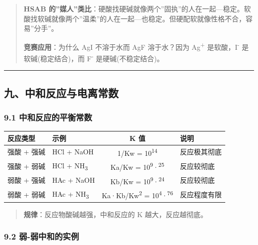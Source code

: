 \documentclass[a4paper,11pt]{ctexart}
\newcounter{none}
\newcommand{\箭}{\ensuremath{\rightarrow}}
\newcommand{\左箭}{\ensuremath{\leftarrow}}
\newcommand{\上箭}{\ensuremath{\uparrow}}
\newcommand{\下箭}{\ensuremath{\downarrow}}
\newcommand{\衡}{\ensuremath{\rightleftharpoons}}
\newcommand{\双箭}{\ensuremath{\leftrightarrow}}
\newcommand{\约等于}{\ensuremath{\approx}}
\newcommand{\小于等于}{\ensuremath{\leq}}
\newcommand{\大于等于}{\ensuremath{\geq}}
\newcommand{\不等于}{\ensuremath{\neq}}
\newcommand{\西格马}{\ensuremath{\sigma}}
\newcommand{\派}{\ensuremath{\pi}}
\begin{document}
\begin{quote}
\textbf{HSAB 的''媒人''类比}：硬酸找硬碱就像两个''固执''的人在一起---稳定。软酸找软碱就像两个''温柔''的人在一起---也稳定。但硬配软就像性格不合，容易''分手''。

\textbf{竞赛应用}：为什么 AgI 不溶于水而 AgF 溶于水？因为 Ag\textsuperscript{+} 是软酸，I\textsuperscript{-} 是软碱(稳定结合)，而 F\textsuperscript{-} 是硬碱(不稳定结合)。
\end{quote}

\begin{center}\rule{0.5\linewidth}{0.5pt}\end{center}

\subsection{九、中和反应与电离常数}\label{ux4e5dux4e2dux548cux53cdux5e94ux4e0eux7535ux79bbux5e38ux6570}

\subsubsection{9.1 中和反应的平衡常数}\label{ux4e2dux548cux53cdux5e94ux7684ux5e73ux8861ux5e38ux6570}

{\def\LTcaptype{none} %
\begin{longtable}[]{@{}llcl@{}}
\toprule\noalign{}
反应类型 & 示例 & K 值 & 说明 \\
\midrule\noalign{}
\endhead
\bottomrule\noalign{}
\endlastfoot
强酸 + 强碱 & HCl + NaOH & 1/Kw = 10\textsuperscript{14} & 反应极其彻底 \\
强酸 + 弱碱 & HCl + NH\textsubscript{3} & Ka/Kw = 10\textsuperscript{9}·\textsuperscript{25} & 反应较彻底 \\
弱酸 + 强碱 & HAc + NaOH & Kb/Kw = 10\textsuperscript{9}·\textsuperscript{24} & 反应较彻底 \\
弱酸 + 弱碱 & HAc + NH\textsubscript{3} & Ka·Kb/Kw\textsuperscript{2} = 10\textsuperscript{4}·\textsuperscript{76} & 反应程度有限 \\
\end{longtable}
}

\begin{quote}
\textbf{规律}：反应物酸碱越强，中和反应的 K 越大，反应越彻底。
\end{quote}

\subsubsection{9.2 弱-弱中和的实例}\label{ux5f31-ux5f31ux4e2dux548cux7684ux5b9eux4f8b}
\end{document}
